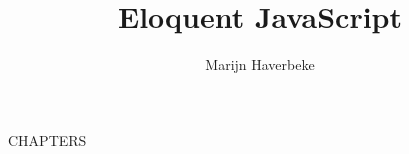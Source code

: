 \documentclass{article}
\title{Eloquent JavaScript}
\author{Marijn Haverbeke}
\begin{document}
\maketitle
\tableofcontents
\mainmatter

{{CHAPTERS}}
\end{document}
